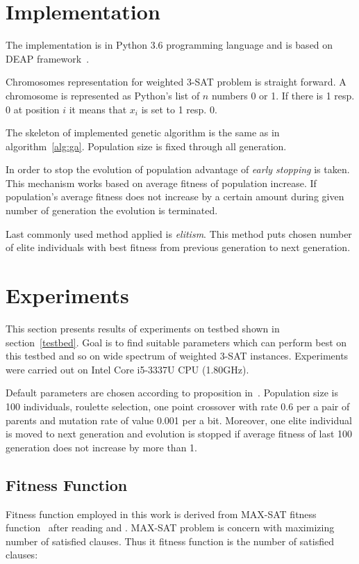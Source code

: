 \documentclass{article}
\begin{document}
\section{Implementation}

The implementation is in Python 3.6 programming language
and is based on DEAP framework~\cite{fortin2012}.

Chromosomes representation for weighted 3-SAT problem is straight forward.
A chromosome is represented as Python's list of $n$ numbers 0 or 1.
If there is 1 resp. 0 at position $i$ it means that $x_i$ is set to 1 resp. 0.

The skeleton of implemented genetic algorithm is the same as
in algorithm~\ref{alg:ga}.
Population size is fixed through all generation.

In order to stop the evolution of population advantage of
\textit{early stopping} is taken.
This mechanism works based on average fitness of population increase.
If population's average fitness does not increase by a certain amount
during given number of generation the evolution is terminated.

Last commonly used method applied is \textit{elitism}.
This method puts chosen number of elite individuals with best fitness
from previous generation to next generation.

\section{Experiments}

This section presents results of experiments on testbed
shown in section~\ref{testbed}.
Goal is to find suitable parameters
which can perform best on this testbed
and so on wide spectrum of weighted 3-SAT instances.
Experiments were carried out on Intel Core i5-3337U CPU (1.80GHz).

Default parameters are chosen according to proposition in~\cite{dejong1975}.
Population size is 100 individuals, roulette selection,
one point crossover with rate 0.6 per a pair of parents
and mutation rate of value 0.001 per a bit.
Moreover, one elite individual is moved to next generation
and evolution is stopped
if average fitness of last 100 generation does not increase by more than 1.

\subsection{Fitness Function}

Fitness function employed in this work is derived from MAX-SAT fitness
function~\cite{dejong1989} after reading \cite{gottlieb2002}
and \cite{ellerweg2004}.
MAX-SAT problem is concern with maximizing number of satisfied clauses.
Thus it fitness function is the number of satisfied clauses:
\end{document}
